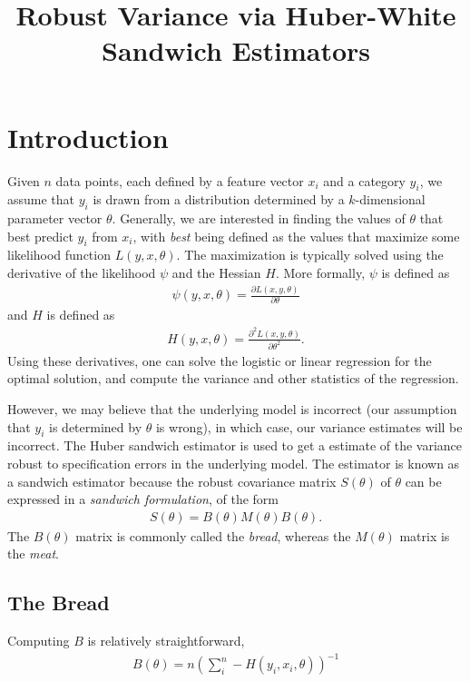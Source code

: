 \documentclass[12pt]{article}
\title{Robust Variance via Huber-White Sandwich Estimators}
\begin{document}
\maketitle

\section{Introduction}
Given  $n$ data points, each defined by a feature  vector $x_i$ and a category $y_i$, we assume that $y_i$ is drawn from a distribution determined by a $k$-dimensional parameter vector $\theta$.  Generally, we are interested in finding the values of $\theta$ that best predict $y_i$ from $x_i$, with \textit{best} being defined as the values that maximize some likelihood function $L(y,x,\theta)$.  The maximization is typically solved using the derivative of the likelihood $\psi$  and the Hessian $H$.  More formally, $\psi$ is defined as 
\begin{align}
\psi(y,x, \theta) = \frac{\partial L(x,y,\theta)}{\partial \theta}
\end{align} 
and $H$ is defined as
\begin{align}
H(y,x, \theta) = \frac{\partial^2 L(x,y,\theta)}{\partial \theta^2}.
\end{align} 
Using these derivatives, one can solve the logistic or linear regression for the optimal solution, and compute the variance and other statistics of the regression.  


However, we may believe that the underlying model is incorrect (our assumption that  $y_i$ is determined by $\theta$ is wrong), in which case, our variance estimates will be incorrect.  The Huber sandwich estimator is used to get a estimate of the variance robust to specification errors in the underlying model.  The estimator is known as a sandwich estimator because the robust covariance matrix $S(\theta)$ of $\theta$ can be expressed in a \textit{sandwich formulation}, of the form
\begin{align}
S(\theta) = B(\theta) M(\theta) B(\theta).  
\end{align}
The $B(\theta)$ matrix is commonly called the \textit{bread}, whereas the $M(\theta)$ matrix is the \textit{meat}.  

\subsection{The Bread}
Computing $B$ is relatively straightforward, 
\begin{align}
B(\theta) = n\left(\sum_i^n -H(y_i, x_i, \theta) \right)^{-1}
\end{align}
\end{document}
